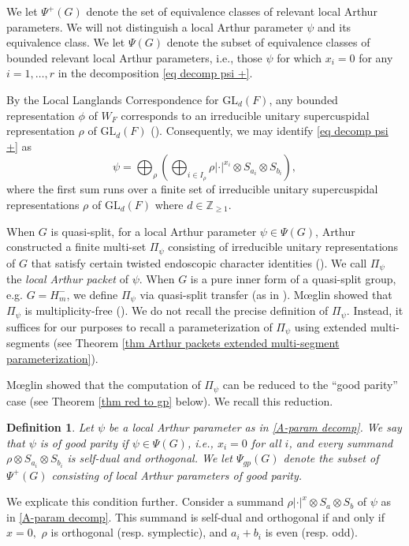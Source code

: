 \documentclass[11pt,letterpaper]{amsart}
\newcommand{\GL}{\mathrm{GL}}
\newtheorem{defn}[thm]{Definition}
\numberwithin{equation}{section}
\begin{document}
We let $\Psi^+(G)$ denote the set of equivalence classes of relevant local Arthur parameters. We will not distinguish a local Arthur parameter $\psi$ and its equivalence class. We let $\Psi(G)$ denote the subset of equivalence classes of bounded relevant local Arthur parameters, i.e., those $\psi$ for which $x_i=0$ for any $i=1,\dots,r$ in the decomposition \eqref{eq decomp psi +}.

By the Local Langlands Correspondence for $\GL_{d}(F)$, any bounded representation $\phi$ of $W_F$ corresponds to an irreducible unitary supercuspidal representation $\rho$ of $\GL_{d}(F)$ (\cite{HT01, Hen00, Sch13}). Consequently, we may identify \eqref{eq decomp psi +} as
\begin{equation}\label{A-param decomp}
  \psi = \bigoplus_{\rho}\left(\bigoplus_{i\in I_\rho} \rho|\cdot|^{x_i} \otimes S_{a_i} \otimes S_{b_i}\right),  
\end{equation}
where the first sum runs over a finite set of
irreducible unitary supercuspidal representations $\rho$ of $\GL_d(F)$ where $d \in \mathbb{Z}_{\geq 1}$.

When $G$ is quasi-split,
for a local Arthur parameter $\psi \in \Psi(G)$, Arthur constructed a finite multi-set $\Pi_\psi$ consisting of irreducible unitary representations of $G$ that satisfy certain twisted endoscopic character identities (\cite{Art13}). We call $\Pi_\psi$ the \emph{local Arthur packet} of $\psi.$ When $G$ is a pure inner form of a quasi-split group, e.g. $G=H_m^-$, we define $\Pi_\psi$ via quasi-split transfer (as in \cite{Moe11a}).
M{\oe}glin showed that $\Pi_\psi$ is multiplicity-free (\cite{Moe11a}). We do not recall the precise definition of $\Pi_\psi$. Instead, it suffices for our purposes to recall a parameterization of $\Pi_\psi$ using extended multi-segments (see Theorem \ref{thm Arthur packets extended multi-segment parameterization}).

M{\oe}glin showed that the computation of $\Pi_\psi$ can be reduced to the ``good parity'' case (see Theorem \ref{thm red to gp} below). We recall this reduction.
\begin{defn}\label{def Arthur parameter good parity}
    Let $\psi$ be a local Arthur parameter as in \eqref{A-param decomp}. We say that $\psi$ is of \emph{good parity} if $\psi \in \Psi(G)$, i.e., $x_i=0$ for all $i$, and every summand $\rho \otimes S_{a_i} \otimes S_{b_i}$ is self-dual and orthogonal.
We let $\Psi_{gp}(G)$ denote the subset of $\Psi^+(G)$ consisting of local Arthur parameters of good parity.
\end{defn}
We explicate this condition further. 
Consider a summand $\rho|\cdot|^x\otimes S_a \otimes S_b$ of $\psi$ as in \eqref{A-param decomp}. This summand is self-dual and orthogonal if and only if $x=0,$ $\rho$ is orthogonal (resp. symplectic), and $a_i+b_i$ is even (resp. odd).
\end{document}
